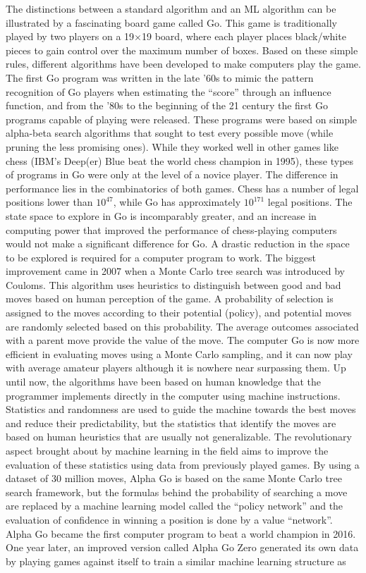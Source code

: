 \documentclass[main]{subfiles}
\begin{document}
The distinctions between a standard algorithm and an ML algorithm can be illustrated by a fascinating board game called Go. This game is traditionally played by two players on a 19$\times$19 board, where each player places black/white pieces to gain control over the maximum number of boxes. Based on these simple rules, different algorithms have been developed to make computers play the game. The first Go program was written in the late ’60s to mimic the pattern recognition of Go players when estimating the ``score'' through an influence function,\autocite{zobrist1970feature} and from the ’80s to the beginning of the 21 century the first Go programs capable of playing were released. These programs were based on simple alpha-beta search algorithms that sought to test every possible move (while pruning the less promising ones). While they worked well in other games like chess (IBM's Deep(er) Blue beat the world chess champion in 1995), these types of programs in Go were only at the level of a novice player. The difference in performance lies in the combinatorics of both games. Chess has a number of legal positions lower than $10^{47}$,\autocite{website_labelle} while Go has approximately $10^{171}$ legal positions.\autocite{Tromp_2007,github_tromp_go} The state space to explore in Go is incomparably greater, and an increase in computing power that improved the performance of chess-playing computers would not make a significant difference for Go. A drastic reduction in the space to be explored is required for a computer program to work. The biggest improvement came in 2007 when a Monte Carlo tree search was introduced by Couloms.\autocite{Coulom_2007} This algorithm uses heuristics to distinguish between good and bad moves based on human perception of the game. A probability of selection is assigned to the moves according to their potential (policy), and potential moves are randomly selected based on this probability. The average outcomes associated with a parent move provide the value of the move. The computer Go is now more efficient in evaluating moves using a Monte Carlo sampling, and it can now play with average amateur players although it is nowhere near surpassing them. Up until now, the algorithms have been based on human knowledge that the programmer implements directly in the computer using machine instructions. Statistics and randomness are used to guide the machine towards the best moves and reduce their predictability, but the statistics that identify the moves are based on human heuristics that are usually not generalizable. The revolutionary aspect brought about by machine learning in the field aims to improve the evaluation of these statistics using data from previously played games. By using a dataset of 30 million moves, Alpha Go is based on the same Monte Carlo tree search framework, but the formulas behind the probability of searching a move are replaced by a machine learning model called the ``policy network'' and the evaluation of confidence in winning a position is done by a value ``network''.\autocite{Silver_2016} Alpha Go became the first computer program to beat a world champion in 2016. One year later, an improved version called Alpha Go Zero generated its own data by playing games against itself to train a similar machine learning structure as 
\end{document}
